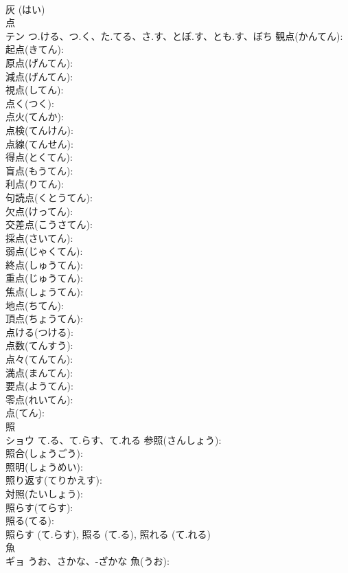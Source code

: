 \documentclass[8pt]{extreport}
\begin{document}
\begin{CJK}{UTF8}{min}
\\	灰 (はい)
\\	点			
\\	テン	つ.ける、つ.く、た.てる、さ.す、とぼ.す、とも.す、ぼち	観点(かんてん): 
\\	起点(きてん): 
\\	原点(げんてん): 
\\	減点(げんてん): 
\\	視点(してん): 
\\	点く(つく): 
\\	点火(てんか): 
\\	点検(てんけん): 
\\	点線(てんせん): 
\\	得点(とくてん): 
\\	盲点(もうてん): 
\\	利点(りてん): 
\\	句読点(くとうてん): 
\\	欠点(けってん): 
\\	交差点(こうさてん): 
\\	採点(さいてん): 
\\	弱点(じゃくてん): 
\\	終点(しゅうてん): 
\\	重点(じゅうてん): 
\\	焦点(しょうてん): 
\\	地点(ちてん): 
\\	頂点(ちょうてん): 
\\	点ける(つける): 
\\	点数(てんすう): 
\\	点々(てんてん): 
\\	満点(まんてん): 
\\	要点(ようてん): 
\\	零点(れいてん): 
\\	点(てん): 
\\	照			
\\	ショウ	て.る、て.らす、て.れる	参照(さんしょう): 
\\	照合(しょうごう): 
\\	照明(しょうめい): 
\\	照り返す(てりかえす): 
\\	対照(たいしょう): 
\\	照らす(てらす): 
\\	照る(てる): 
\\	照らす (て.らす), 照る (て.る), 照れる (て.れる)
\\	魚			
\\	ギョ	うお、さかな、-ざかな	魚(うお): 

\end{CJK}
\end{document}
